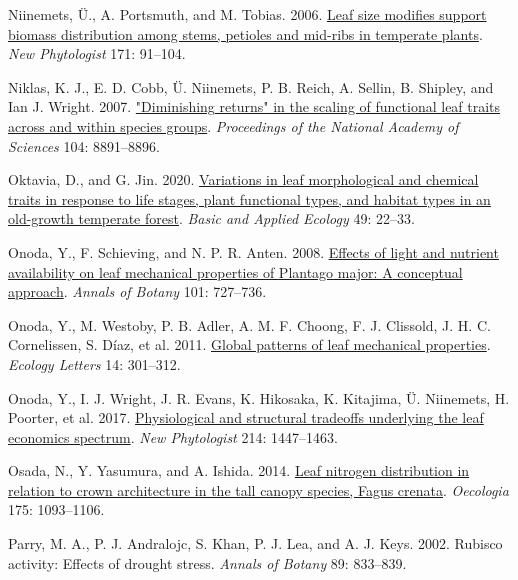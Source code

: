 \documentclass[
  12pt,
  a4paper,
,tablecaptionabove
]{scrartcl}
\newlength{\cslhangindent}
\newenvironment{CSLReferences}[2] %
 {%
  \setlength{\parindent}{0pt}
  \ifodd #1 \everypar{\setlength{\hangindent}{\cslhangindent}}\ignorespaces\fi
  \ifnum #2 > 0
  \setlength{\parskip}{#2\baselineskip}
  \fi
 }%
 {}
\begin{document}
\begin{CSLReferences}{1}{0}
\leavevmode{}%
Niinemets, Ü., A. Portsmuth, and M. Tobias. 2006. \href{https://doi.org/10.1111/j.1469-8137.2006.01741.x}{Leaf size modifies support biomass distribution among stems, petioles and mid-ribs in temperate plants}. \emph{New Phytologist} 171: 91--104.

\leavevmode{}%
Niklas, K. J., E. D. Cobb, Ü. Niinemets, P. B. Reich, A. Sellin, B. Shipley, and Ian J. Wright. 2007. \href{https://doi.org/10.1073/pnas.0701135104}{"{Diminishing} returns" in the scaling of functional leaf traits across and within species groups}. \emph{Proceedings of the National Academy of Sciences} 104: 8891--8896.

\leavevmode{}%
Oktavia, D., and G. Jin. 2020. \href{https://doi.org/10.1016/j.baae.2020.09.010}{Variations in leaf morphological and chemical traits in response to life stages, plant functional types, and habitat types in an old-growth temperate forest}. \emph{Basic and Applied Ecology} 49: 22--33.

\leavevmode{}%
Onoda, Y., F. Schieving, and N. P. R. Anten. 2008. \href{https://doi.org/10.1093/aob/mcn013}{Effects of light and nutrient availability on leaf mechanical properties of {Plantago} major: {A} conceptual approach}. \emph{Annals of Botany} 101: 727--736.

\leavevmode{}%
Onoda, Y., M. Westoby, P. B. Adler, A. M. F. Choong, F. J. Clissold, J. H. C. Cornelissen, S. Díaz, et al. 2011. \href{https://doi.org/10.1111/j.1461-0248.2010.01582.x}{Global patterns of leaf mechanical properties}. \emph{Ecology Letters} 14: 301--312.

\leavevmode{}%
Onoda, Y., I. J. Wright, J. R. Evans, K. Hikosaka, K. Kitajima, Ü. Niinemets, H. Poorter, et al. 2017. \href{https://doi.org/10.1111/nph.14496}{Physiological and structural tradeoffs underlying the leaf economics spectrum}. \emph{New Phytologist} 214: 1447--1463.

\leavevmode{}%
Osada, N., Y. Yasumura, and A. Ishida. 2014. \href{https://doi.org/10.1007/s00442-014-2966-y}{Leaf nitrogen distribution in relation to crown architecture in the tall canopy species, {Fagus} crenata}. \emph{Oecologia} 175: 1093--1106.

\leavevmode{}%
Parry, M. A., P. J. Andralojc, S. Khan, P. J. Lea, and A. J. Keys. 2002. Rubisco activity: Effects of drought stress. \emph{Annals of Botany} 89: 833--839.


\end{CSLReferences}
\end{document}
